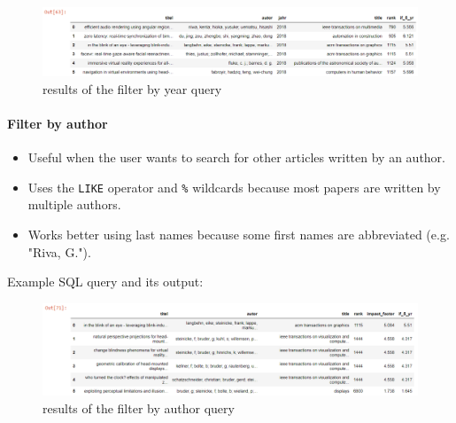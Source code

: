 \documentclass[11pt]{article}
\makeatletter
\def\maxwidth{\ifdim\Gin@nat@width>\linewidth\linewidth
    \else\Gin@nat@width\fi}
\let\Oldincludegraphics\includegraphics
\renewcommand{\includegraphics}[1]{\Oldincludegraphics[width=.8\maxwidth]{#1}}
\providecommand{\tightlist}{%
      \setlength{\itemsep}{0pt}\setlength{\parskip}{0pt}}
\newenvironment{Shaded}{}{}
\newcommand{\KeywordTok}[1]{\textcolor[rgb]{0.00,0.44,0.13}{\textbf{{#1}}}}
\newcommand{\StringTok}[1]{\textcolor[rgb]{0.25,0.44,0.63}{{#1}}}
\newcommand{\FunctionTok}[1]{\textcolor[rgb]{0.02,0.16,0.49}{{#1}}}
\newcommand{\NormalTok}[1]{{#1}}
\makeatother
\begin{document}
\begin{figure}
\centering
\includegraphics{images/filteryear_df.png}
\caption{results of the filter by year query}
\end{figure}

\paragraph{Filter by author}\label{filter-by-author}

\begin{itemize}
\tightlist
\item
  Useful when the user wants to search for other articles written by an
  author.
\item
  Uses the \texttt{LIKE} operator and \texttt{\%} wildcards because most
  papers are written by multiple authors.
\item
  Works better using last names because some first names are abbreviated
  (e.g. "Riva, G.").
\end{itemize}

Example SQL query and its output:

\begin{Shaded}
\end{Shaded}

\begin{figure}
\centering
\includegraphics{images/filterauthor_df.png}
\caption{results of the filter by author query}
\end{figure}
\end{document}
